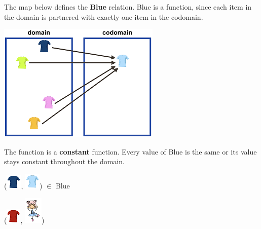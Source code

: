 \documentclass{ximera}
\begin{document}
\begin{definition}
  The map below defines the \textbf{Blue} relation. Blue is a function, since each item in the domain is partnered with exactly one item in the codomain.
  
  

    \includegraphics[width=293px,height=214px]{pics/r12.png}

  
 

  The  function is a \textbf{constant} function.  Every value of Blue is the same or its value stays constant throughout the domain.

  
\end{definition}



\begin{exercise}

 ({\includegraphics[width=28px,height=27px]{pics/elements/shirts/shirts7.png}}, {\includegraphics[width=28px,height=29px]{pics/elements/shirts/shirts3.png}}) $\in$ Blue 

  \begin{multipleChoice}
  \end{multipleChoice}
  \begin{feedback}
({\includegraphics[width=27px,height=28px]{pics/elements/shirts/shirts1.png}},  {\includegraphics[width=33px,height=49px]{pics/elements/family/family2.png}})
  \end{feedback}
\end{exercise}
\end{document}
